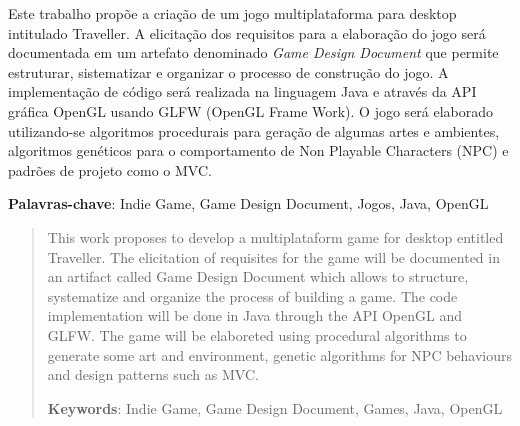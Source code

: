 \documentclass[12pt, 
openright, 
oneside, 
a4paper,    
brazil]{facom-ufu-abntex2}
\begin{document}
\begin{resumo} 

Este trabalho propõe a criação de um jogo multiplataforma  para desktop intitulado Traveller.
A elicitação dos requisitos para a elaboração do jogo será documentada em um artefato denominado \textit{Game Design Document} que permite estruturar, sistematizar e organizar 
o processo de construção do jogo.
A implementação de código será realizada na linguagem Java e através da API gráfica OpenGL usando GLFW (OpenGL Frame Work). 
O jogo será elaborado utilizando-se algoritmos procedurais para geração de algumas artes e ambientes, algoritmos genéticos para o comportamento de Non Playable Characters (NPC) e padrões de projeto como o MVC.
 
 \vspace{\onelineskip}
 \noindent
 \textbf{Palavras-chave}: Indie Game, Game Design Document, Jogos, Java, OpenGL
\end{resumo}

\begin{abstract} 
This work proposes to develop a multiplataform game for desktop entitled Traveller. The elicitation of requisites for the game will be documented in an artifact called Game Design Document which allows to structure, systematize and organize the process of building a game. The code implementation will be done in Java through the API OpenGL and GLFW.  The game will be elaboreted using procedural algorithms to generate some art and environment, genetic algorithms for NPC behaviours and design patterns such as MVC.

 \vspace{\onelineskip}
    
 \noindent
 \textbf{Keywords}: Indie Game, Game Design Document, Games, Java, OpenGL %
\end{abstract}
\cleardoublepage


\listoffigures*
\cleardoublepage


\listoftables*
\cleardoublepage

\lstlistoflistings
\cleardoublepage

\end{document}
